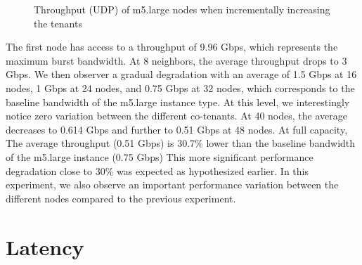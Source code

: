 \begin{figure}[H]
\caption{Throughput (UDP) of m5.large nodes when incrementally increasing the tenants}
\end{figure}
\noindent
The first node has access to a throughput of 9.96 Gbps, which represents the maximum burst bandwidth. 
At 8 neighbors, the average throughput drops to 3 Gbps. We then observer a gradual degradation 
with an average of 1.5 Gbps at 16 nodes, 1 Gbps at 24 nodes, and  0.75 Gbps at 32 nodes,  which corresponds 
to the baseline bandwidth of the m5.large instance type. 
At this level, we interestingly notice zero variation between the 
different co-tenants. At 40 nodes, the average decreases to 0.614 Gbps and further to 0.51 Gbps at 48 nodes.  
At full capacity, The average throughput (0.51 Gbps) is 30.7\% lower than the baseline bandwidth of the 
m5.large instance (0.75 Gbps)
This more significant performance degradation close to 30\% was expected as hypothesized earlier. 
In this experiment, we also observe an important performance variation between the different nodes 
compared to the previous experiment. 
\section{Latency}